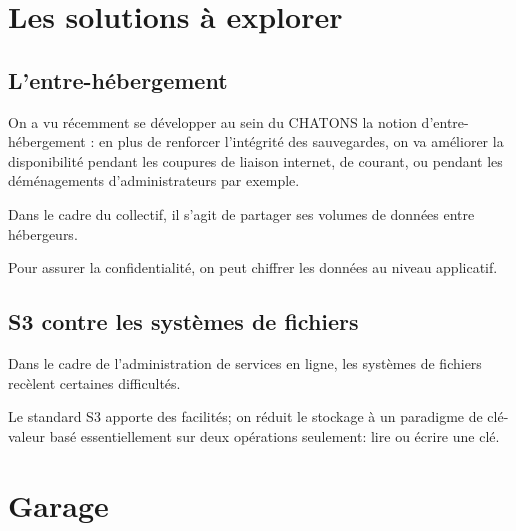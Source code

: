 \documentclass[11pt, aspectratio=1610]{beamer}
\begin{document}
\section{Les solutions à explorer}
\subsection{L'entre-hébergement}
\begin{frame}
\begin{center}
On a vu récemment se développer au sein du CHATONS la notion d'entre-hébergement : en plus de renforcer l'intégrité des sauvegardes, on va améliorer la disponibilité pendant les coupures de liaison internet, de courant, ou pendant les déménagements d'administrateurs par exemple.\linebreak

\vspace{1cm}
{
Dans le cadre du collectif, il s'agit de partager ses volumes de données entre hébergeurs.\linebreak

Pour assurer la confidentialité, on peut chiffrer les données au niveau applicatif.
}
\end{center}
\end{frame}

\subsection{S3 contre les systèmes de fichiers}
\begin{frame}
\begin{center}
Dans le cadre de l'administration de services en ligne, les systèmes de fichiers recèlent certaines difficultés.\linebreak

\vspace{1cm}
Le standard S3 apporte des facilités; on réduit le stockage à un paradigme de clé-valeur basé essentiellement sur deux opérations seulement: lire ou écrire une clé.
\end{center}
\end{frame}

\section{Garage}
\end{document}
